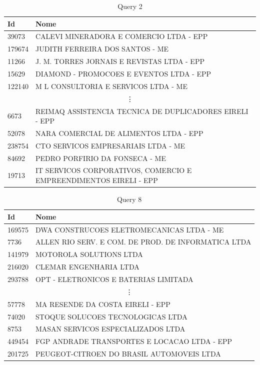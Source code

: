\documentclass{article}
\begin{document}
\begin{table}[H]
  \centering
  \begin{tabular}{ll}
    Id & Nome \\
    \midrule
    39073  &  CALEVI MINERADORA E COMERCIO LTDA - EPP \\
    179674 &  JUDITH FERREIRA DOS SANTOS - ME \\
    11266  &  J. M. TORRES JORNAIS E REVISTAS LTDA - EPP \\
    15629  &  DIAMOND - PROMOCOES E EVENTOS LTDA - EPP \\
    122140 &  M L CONSULTORIA E SERVICOS LTDA - ME \\
    \multicolumn{2}{c}{\vdots} \\
    6673   &  REIMAQ ASSISTENCIA TECNICA DE DUPLICADORES EIRELI - EPP \\
    52078  &  NARA COMERCIAL DE ALIMENTOS LTDA - EPP \\
    238754 &  CTO SERVICOS EMPRESARIAIS LTDA - ME \\
    84692  &  PEDRO PORFIRIO DA FONSECA - ME \\
    19713  &  IT SERVICOS CORPORATIVOS, COMERCIO E EMPREENDIMENTOS EIRELI - EPP \\
    \bottomrule
  \end{tabular}
  \caption*{Query 2}
\end{table}

\begin{table}[H]
  \centering
  \begin{tabular}{ll}
    Id & Nome \\
    \midrule
    169575 &  DWA CONSTRUCOES ELETROMECANICAS LTDA - ME \\
    7736   &  ALLEN RIO SERV. E COM. DE PROD. DE INFORMATICA LTDA \\
    141979 &  MOTOROLA SOLUTIONS LTDA \\
    216020 &  CLEMAR ENGENHARIA LTDA \\
    293788 &  OPT - ELETRONICOS E BATERIAS LIMITADA \\
    \multicolumn{2}{c}{\vdots} \\
    57778  & MA RESENDE DA COSTA EIRELI - EPP \\
    74020  & STOQUE SOLUCOES TECNOLOGICAS LTDA \\
    8753   & MASAN SERVICOS ESPECIALIZADOS LTDA \\
    449454 & FGP ANDRADE TRANSPORTES E LOCACAO LTDA - EPP \\
    201725 & PEUGEOT-CITROEN DO BRASIL AUTOMOVEIS LTDA \\
    \bottomrule
  \end{tabular}
  \caption*{Query 8}
\end{table}
\end{document}
